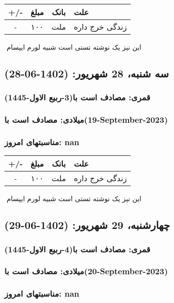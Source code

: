\documentclass{article}
\newcommand{\rnote}[1]{\marginpar{\textcolor{color}{\StrSubstitute{\##1}{ }{\_}}}}
\newcommand{\myRow}[4]{
    #1 & #2 & #3 & #4 \\ \hline
}
\begin{document}
\begin{tabular}{ | c | c | c | p{5cm} |}
    \hline
    \myRow{ +/- }{مبلغ}{بانک}{علت}
    \myRow{-}{۱۰۰}{ملت}{زندگی خرج داره}
\end{tabular}
\newline
\newline

‌
\rnote{تست}
این نیز یک نوشته تستی است شبیه لورم ایپسام




\newpage
{}
\textcolor{color}{
\section{ سه شنبه، 28 شهریور: (1402-06-28) }
\subsubsection*{قمری: مصادف است با(3-ربیع الاول-1445)} 
\subsubsection*{میلادی: مصادف است با(19-September-2023)}
\subsubsection*{مناسبتهای امروز: nan}
}


\begin{tabular}{ | c | c | c | p{5cm} |}
    \hline
    \myRow{ +/- }{مبلغ}{بانک}{علت}
    \myRow{-}{۱۰۰}{ملت}{زندگی خرج داره}
\end{tabular}
\newline
\newline

‌
\rnote{تست}
این نیز یک نوشته تستی است شبیه لورم ایپسام




\newpage
{}
\textcolor{color}{
\section{ چهارشنبه، 29 شهریور: (1402-06-29) }
\subsubsection*{قمری: مصادف است با(4-ربیع الاول-1445)} 
\subsubsection*{میلادی: مصادف است با(20-September-2023)}
\subsubsection*{مناسبتهای امروز: nan}
}
\end{document}
